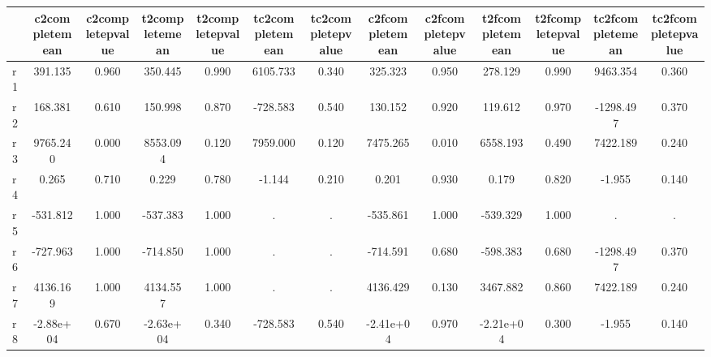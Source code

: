 \begin{table}[htbp]
\begin{tabular}{lcccccccccccc} \hline \hline
 & c2completemean  & c2completepvalue  & t2completemean  & t2completepvalue  & tc2completemean  & tc2completepvalue  & c2fcompletemean  & c2fcompletepvalue  & t2fcompletemean  & t2fcompletepvalue  & tc2fcompletemean  & tc2fcompletepvalue  \\  \hline 
r1 &   391.135 &     0.960 &   350.445 &     0.990 &  6105.733 &     0.340 &   325.323 &     0.950 &   278.129 &     0.990 &  9463.354 &     0.360 \\  
r2 &   168.381 &     0.610 &   150.998 &     0.870 &  -728.583 &     0.540 &   130.152 &     0.920 &   119.612 &     0.970 & -1298.497 &     0.370 \\  
r3 &  9765.240 &     0.000 &  8553.094 &     0.120 &  7959.000 &     0.120 &  7475.265 &     0.010 &  6558.193 &     0.490 &  7422.189 &     0.240 \\  
r4 &     0.265 &     0.710 &     0.229 &     0.780 &    -1.144 &     0.210 &     0.201 &     0.930 &     0.179 &     0.820 &    -1.955 &     0.140 \\  
r5 &  -531.812 &     1.000 &  -537.383 &     1.000 &         . &         . &  -535.861 &     1.000 &  -539.329 &     1.000 &         . &         . \\  
r6 &  -727.963 &     1.000 &  -714.850 &     1.000 &         . &         . &  -714.591 &     0.680 &  -598.383 &     0.680 & -1298.497 &     0.370 \\  
r7 &  4136.169 &     1.000 &  4134.557 &     1.000 &         . &         . &  4136.429 &     0.130 &  3467.882 &     0.860 &  7422.189 &     0.240 \\  
r8 & -2.88e+04 &     0.670 & -2.63e+04 &     0.340 &  -728.583 &     0.540 & -2.41e+04 &     0.970 & -2.21e+04 &     0.300 &    -1.955 &     0.140 \\  
\hline \hline \end{tabular}
\end{table}
